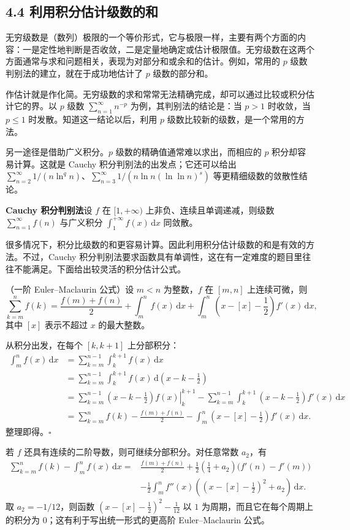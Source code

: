 \subsection*{4.4 利用积分估计级数的和}

无穷级数是（数列）极限的一个等价形式，它与极限一样，主要有两个方面的内容：一是定性地判断是否收敛，二是定量地确定或估计极限值。无穷级数在这两个方面通常与求和问题相关，表现为对部分和或余和的估计。例如，常用的 $p$ 级数判别法的建立，就在于成功地估计了 $p$ 级数的部分和。

作估计就是作化简。无穷级数的求和常常无法精确完成，却可以通过比较或积分估计它的界。以 $p$ 级数 $\sum_{n=1}^{\infty}n^{-p}$ 为例，其判别法的结论是：当 $p>1$ 时收敛，当 $p\leq1$ 时发散。知道这一结论以后，利用 $p$ 级数比较新的级数，是一个常用的方法。

另一途径是借助广义积分。$p$ 级数的精确值通常难以求出，而相应的 $p$ 积分却容易计算。这就是 Cauchy 积分判别法的出发点；它还可以给出 $\sum_{n=2}^{\infty}1/(n\ln^q n)$、$\sum_{n=3}^{\infty}1/(n\ln n(\ln\ln n)^s)$ 等更精细级数的敛散性结论。

\noindent\textbf{Cauchy 积分判别法}\quad 设 $f$ 在 $[1,+\infty)$ 上非负、连续且单调递减，则级数 $\sum_{n=1}^{\infty}f(n)$ 与广义积分 $\int_1^{+\infty}f(x)\,\mathrm dx$ 同敛散。

很多情况下，积分比级数的和更容易计算。因此利用积分估计级数的和是有效的方法。不过，Cauchy 积分判别法要求函数具有单调性，这在有一定难度的题目里往往不能满足。下面给出较灵活的积分估计公式。

（一阶 Euler--Maclaurin 公式）设 $m<n$ 为整数，$f$ 在 $[m,n]$ 上连续可微，则
\[
\sum_{k=m}^{n}f(k)
=\frac{f(m)+f(n)}{2}+\int_m^n f(x)\,\mathrm dx
+\int_m^n\left(x-[x]-\frac12\right)f'(x)\,\mathrm dx,
\]
其中 $[x]$ 表示不超过 $x$ 的最大整数。

\pf 从积分出发，在每个 $[k,k+1]$ 上分部积分：
\begin{align*}
\int_m^n f(x)\,\mathrm dx
&=\sum_{k=m}^{n-1}\int_k^{k+1}f(x)\,\mathrm dx\\
&=\sum_{k=m}^{n-1}\int_k^{k+1}f(x)\,\mathrm d\left(x-k-\frac12\right)\\
&=\sum_{k=m}^{n-1}\left.\left(x-k-\frac12\right)f(x)\right|_k^{k+1}
-\sum_{k=m}^{n-1}\int_k^{k+1}\left(x-k-\frac12\right)f'(x)\,\mathrm dx\\
&=\sum_{k=m}^{n}f(k)-\frac{f(m)+f(n)}2
-\int_m^n\left(x-[x]-\frac12\right)f'(x)\,\mathrm dx.
\end{align*}
整理即得。\hfill$\square$

若 $f$ 还具有连续的二阶导数，则可继续分部积分。对任意常数 $a_2$，有
\begin{align*}
\sum_{k=m}^{n}f(k)-\int_m^n f(x)\,\mathrm dx
={}&\frac{f(m)+f(n)}2
+\frac12\left(\frac14+a_2\right)\bigl(f'(n)-f'(m)\bigr)\\
&-\frac12\int_m^n f''(x)
\left(\left(x-[x]-\frac12\right)^2+a_2\right)\,\mathrm dx.
\end{align*}
取 $a_2=-1/12$，则函数 $\left(x-[x]-\tfrac12\right)^2-\tfrac1{12}$ 以 $1$ 为周期，而且它在每个周期上的积分为 $0$；这有利于写出统一形式的更高阶 Euler--Maclaurin 公式。

